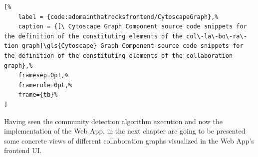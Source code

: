 \begin{sublstlisting}
    \noindent\begin{minipage}{\linewidth} %
        \noindentAll graph elements joined using spread operator expansion}
        ]{code/adomainthatrocksfrontend/CytoscapeGraph.tsx}
    \end{minipage}%
\end{sublstlisting}%
%
\vspace*{-5.7pt}%
\begin{lstlisting}[%
    label = {code:adomainthatrocksfrontend/CytoscapeGraph},%
    caption = {[\ Cytoscape Graph Component source code snippets for the definition of the constituting elements of the col\-la\-bo\-ra\-tion graph]\gls{Cytoscape} Graph Component source code snippets for the definition of the constituting elements of the collaboration graph},%
    framesep=0pt,%
    framerule=0pt,%
    frame={tb}%
]
\end{lstlisting}

Having seen the community detection algorithm execution and now the implementation of the Web App, in the next chapter are going to be presented some concrete views of different collaboration graphs visualized in the Web App's frontend UI.
\newpage
\thispagestyle{empty}
